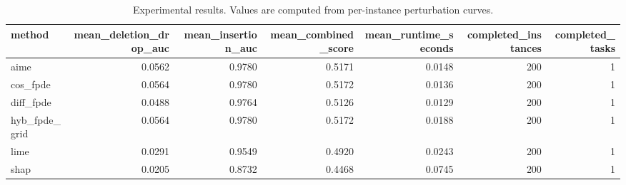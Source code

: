 \begin{table}[t]
\caption{Experimental results. Values are computed from per-instance perturbation curves.}
\label{tab:main_results_computed}
\centering
\begin{tabular}{lrrrrrr}
\toprule
method & mean\_deletion\_drop\_auc & mean\_insertion\_auc & mean\_combined\_score & mean\_runtime\_seconds & completed\_instances & completed\_tasks \\
\midrule
aime & 0.0562 & 0.9780 & 0.5171 & 0.0148 & 200 & 1 \\
cos\_fpde & 0.0564 & 0.9780 & 0.5172 & 0.0136 & 200 & 1 \\
diff\_fpde & 0.0488 & 0.9764 & 0.5126 & 0.0129 & 200 & 1 \\
hyb\_fpde\_grid & 0.0564 & 0.9780 & 0.5172 & 0.0188 & 200 & 1 \\
lime & 0.0291 & 0.9549 & 0.4920 & 0.0243 & 200 & 1 \\
shap & 0.0205 & 0.8732 & 0.4468 & 0.0745 & 200 & 1 \\
\bottomrule
\end{tabular}

\end{table}
